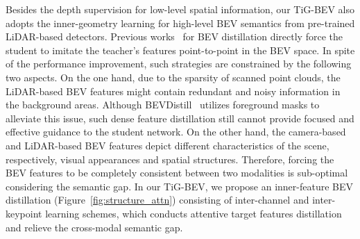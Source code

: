 Besides the depth supervision for low-level spatial information, our TiG-BEV also adopts the inner-geometry learning for high-level BEV semantics from pre-trained LiDAR-based detectors. 
Previous works~\cite{b9,b52} for BEV distillation directly force the student to imitate the teacher's features point-to-point in the BEV space. In spite of the performance improvement, such strategies are constrained by the following two aspects. On the one hand, due to the sparsity of scanned point clouds, the LiDAR-based BEV features might contain redundant and noisy information in the background areas. Although BEVDistill~\cite{b9} utilizes foreground masks to alleviate this issue, such dense feature distillation still cannot provide focused and effective guidance to the student network. On the other hand, the camera-based and LiDAR-based BEV features depict different characteristics of the scene, respectively, visual appearances and spatial structures. Therefore, forcing the BEV features to be completely consistent between two modalities is sub-optimal considering the semantic gap. In our TiG-BEV, we propose an inner-feature BEV distillation (Figure~\ref{fig:structure_attn}) consisting of inter-channel and inter-keypoint learning schemes, which conducts attentive target features distillation and relieve the cross-modal semantic gap.



